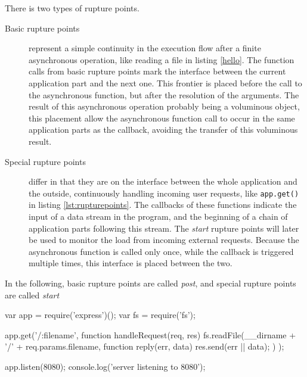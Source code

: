 
There is two types of rupture points.
\begin{description}
  \item[Basic rupture points] represent a simple continuity in the execution flow after a finite asynchronous operation, like reading a file in listing \ref{hello}.
  The function calls from basic rupture points mark the interface between the current application part and the next one.
  This frontier is placed before the call to the asynchronous function, but after the resolution of the arguments.
  The result of this asynchronous operation probably being a voluminous object, this placement allow the asynchronous function call to occur in the same application parts as the callback, avoiding the transfer of this voluminous result.
  \item[Special rupture points] differ in that they are on the interface between the whole application and the outside, continuously handling incoming user requests, like \texttt{app.get()} in listing \ref{lst:rupturepoints}.
  The callbacks of these functions indicate the input of a data stream in the program, and the beginning of a chain of application parts following this stream.
  The \textit{start} rupture points will later be used to monitor the load from incoming external requests.
  Because the asynchronous function is called only once, while the callback is triggered multiple times, this interface is placed between the two.
\end{description}
In the following, basic rupture points are called \textit{post}, and special rupture points are called \textit{start}

\begin{code}[Javascript, caption={Example of an application presenting the two types of rupture points : a \texttt{start} with the call to \texttt{app.get()}, and a \texttt{post} with the call to \texttt{fs.readFile()}},label={lst:rupturepoints}]
var app = require('express')();
var fs = require('fs');

app.get('/:filename', function handleRequest(req, res) {
  fs.readFile(__dirname + '/' + req.params.filename, function reply(err, data) {
    res.send(err || data);
  })
});

app.listen(8080);
console.log('server listening to 8080');
\end{code}

